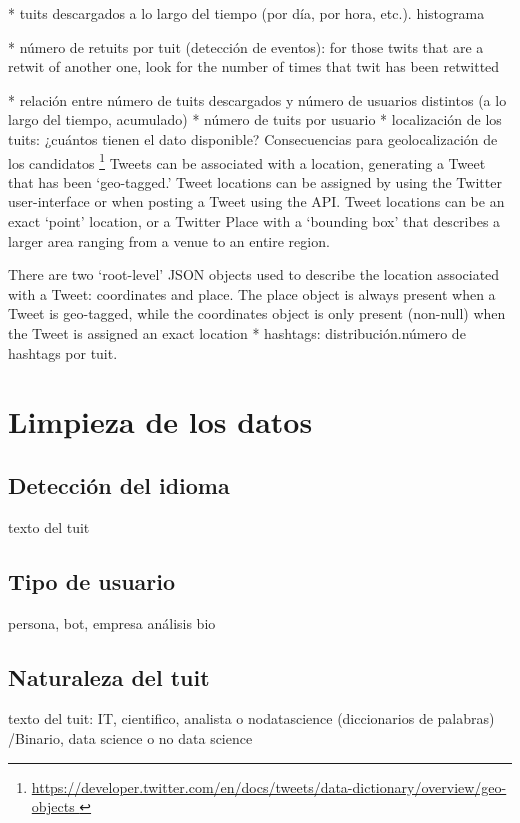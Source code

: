 * tuits descargados a lo largo del tiempo (por día, por hora, etc.). histograma

* número de retuits por tuit (detección de eventos): for those twits that are a retwit of another one, look for the number of times that twit has been retwitted

* relación entre número de tuits descargados y número de usuarios distintos (a lo largo del tiempo, acumulado)
* número de tuits por usuario
* localización de los tuits: ¿cuántos tienen el dato disponible? Consecuencias para geolocalización de los candidatos
\footnote{\url{https://developer.twitter.com/en/docs/tweets/data-dictionary/overview/geo-objects }}
Tweets can be associated with a location, generating a Tweet that has been ‘geo-tagged.’ Tweet locations can be assigned by using the Twitter user-interface or when posting a Tweet using the API. Tweet locations can be an exact ‘point’ location, or a Twitter Place with a ‘bounding box’ that describes a larger area ranging from a venue to an entire region.

There are two ‘root-level’ JSON objects used to describe the location associated with a Tweet: coordinates and place.
The place object is always present when a Tweet is geo-tagged, while the coordinates object is only present (non-null) when the Tweet is assigned an exact location
* hashtags: distribución.número de hashtags por tuit.


\section{Limpieza de los datos}
\label{sect:limpieza_de_los_datos}

\subsection{Detección del idioma} 
texto del tuit
\subsection{Tipo de usuario}
persona, bot, empresa análisis bio
\subsection{Naturaleza del tuit}
texto del tuit:  IT, cientifico, analista o nodatascience (diccionarios de palabras)
					/Binario, data science o no data science
